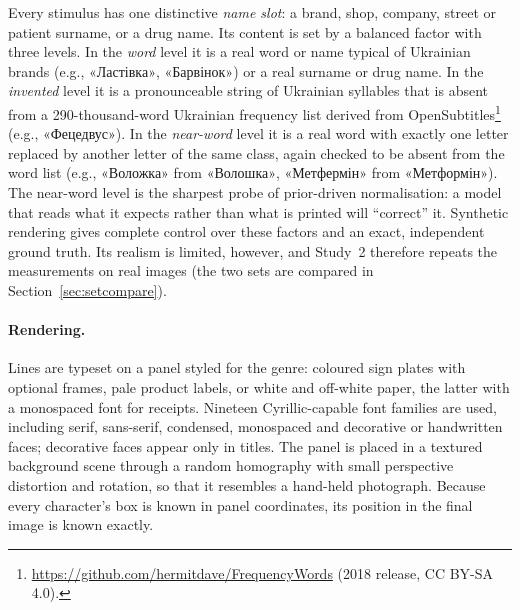Every stimulus has one distinctive \emph{name slot}: a brand, shop, company, street or patient surname, or a drug name. Its content is set by a balanced factor with three levels. In the \emph{word} level it is a real word or name typical of Ukrainian brands (e.g., \foreignlanguage{ukrainian}{«Ластівка»}, \foreignlanguage{ukrainian}{«Барвінок»}) or a real surname or drug name. In the \emph{invented} level it is a pronounceable string of Ukrainian syllables that is absent from a 290-thousand-word Ukrainian frequency list derived from OpenSubtitles\footnote{\url{https://github.com/hermitdave/FrequencyWords} (2018 release, CC BY-SA 4.0).} (e.g., \foreignlanguage{ukrainian}{«Фецедвус»}). In the \emph{near-word} level it is a real word with exactly one letter replaced by another letter of the same class, again checked to be absent from the word list (e.g., \foreignlanguage{ukrainian}{«Воложка»} from \foreignlanguage{ukrainian}{«Волошка»}, \foreignlanguage{ukrainian}{«Метфермін»} from \foreignlanguage{ukrainian}{«Метформін»}). The near-word level is the sharpest probe of prior-driven normalisation: a model that reads what it expects rather than what is printed will ``correct'' it. Synthetic rendering gives complete control over these factors and an exact, independent ground truth. Its realism is limited, however, and Study~2 therefore repeats the measurements on real images (the two sets are compared in Section~\ref{sec:setcompare}).

\paragraph{Rendering.} Lines are typeset on a panel styled for the genre: coloured sign plates with optional frames, pale product labels, or white and off-white paper, the latter with a monospaced font for receipts. Nineteen Cyrillic-capable font families are used, including serif, sans-serif, condensed, monospaced and decorative or handwritten faces; decorative faces appear only in titles. The panel is placed in a textured background scene through a random homography with small perspective distortion and rotation, so that it resembles a hand-held photograph. Because every character's box is known in panel coordinates, its position in the final image is known exactly.

